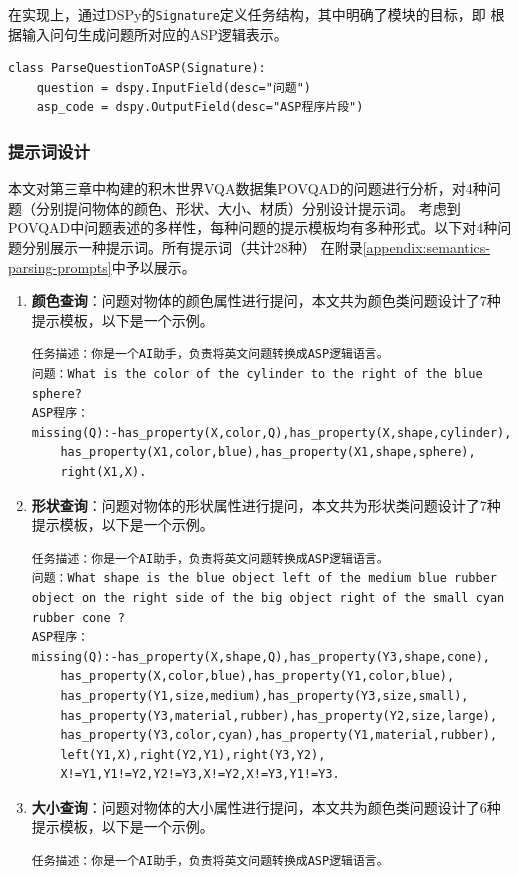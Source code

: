 在实现上，通过DSPy的\texttt{Signature}定义任务结构，其中明确了模块的目标，即
根据输入问句生成问题所对应的ASP逻辑表示。
\begin{lstlisting}
class ParseQuestionToASP(Signature):
    question = dspy.InputField(desc="问题")
    asp_code = dspy.OutputField(desc="ASP程序片段")
\end{lstlisting}
\subsubsection{提示词设计}
本文对第三章中构建的积木世界VQA数据集POVQAD的问题进行分析，对4种问题（分别提问物体的颜色、形状、大小、材质）分别设计提示词。
考虑到POVQAD中问题表述的多样性，每种问题的提示模板均有多种形式。以下对4种问题分别展示一种提示词。所有提示词（共计28种）
在附录\ref{appendix:semantics-parsing-prompts}中予以展示。
\begin{enumerate}[nosep]
\item \textbf{颜色查询}：问题对物体的颜色属性进行提问，本文共为颜色类问题设计了7种提示模板，以下是一个示例。
\begin{lstlisting}
任务描述：你是一个AI助手，负责将英文问题转换成ASP逻辑语言。
问题：What is the color of the cylinder to the right of the blue sphere?
ASP程序：
missing(Q):-has_property(X,color,Q),has_property(X,shape,cylinder),
    has_property(X1,color,blue),has_property(X1,shape,sphere),
    right(X1,X).
\end{lstlisting}
\item \textbf{形状查询}：问题对物体的形状属性进行提问，本文共为形状类问题设计了7种提示模板，以下是一个示例。
\begin{lstlisting}
任务描述：你是一个AI助手，负责将英文问题转换成ASP逻辑语言。
问题：What shape is the blue object left of the medium blue rubber object on the right side of the big object right of the small cyan rubber cone ?
ASP程序：
missing(Q):-has_property(X,shape,Q),has_property(Y3,shape,cone),
    has_property(X,color,blue),has_property(Y1,color,blue),
    has_property(Y1,size,medium),has_property(Y3,size,small),
    has_property(Y3,material,rubber),has_property(Y2,size,large),
    has_property(Y3,color,cyan),has_property(Y1,material,rubber),
    left(Y1,X),right(Y2,Y1),right(Y3,Y2),
    X!=Y1,Y1!=Y2,Y2!=Y3,X!=Y2,X!=Y3,Y1!=Y3.
\end{lstlisting}
\item \textbf{大小查询}：问题对物体的大小属性进行提问，本文共为颜色类问题设计了6种提示模板，以下是一个示例。
\begin{lstlisting}
任务描述：你是一个AI助手，负责将英文问题转换成ASP逻辑语言。

\end{lstlisting}
\end{enumerate}
